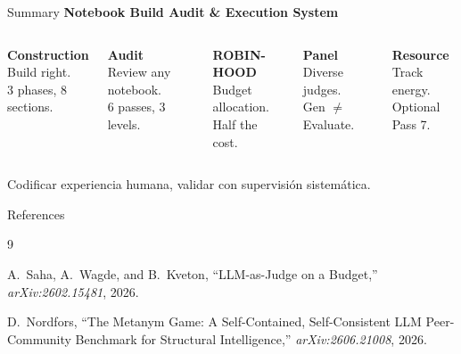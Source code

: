 \documentclass[11pt, aspectratio=169]{beamer}
\begin{document}
\begin{frame}{Summary}
  \centering
  \Large\textbf{Notebook Build Audit \& Execution System}

  \vspace{0.5cm}
  \begin{columns}[T]
      \centering
      \textbf{Construction}\\
      {\small Build right.\\
      3 phases, 8 sections.}

      \centering
      \textbf{Audit}\\
      {\small Review any notebook.\\
      6 passes, 3 levels.}

      \centering
      \textbf{ROBIN-HOOD}\\
      {\small Budget allocation.\\
      Half the cost.}

      \centering
      \textbf{Panel}\\
      {\small Diverse judges.\\
      Gen $\neq$ Evaluate.}

      \centering
      \textbf{Resource}\\
      {\small Track energy.\\
      Optional Pass 7.}
  \end{columns}

  \vspace{0.8cm}
  {\Large\alert{Codificar experiencia humana, validar con supervisión sistemática.}}
\end{frame}

\begin{frame}[allowframebreaks]{References}
  \footnotesize
  \begin{thebibliography}{9}

  A.~Saha, A.~Wagde, and B.~Kveton,
  ``LLM-as-Judge on a Budget,''
  \textit{arXiv:2602.15481}, 2026.

  D.~Nordfors,
  ``The Metanym Game: A Self-Contained, Self-Consistent LLM Peer-Community
  Benchmark for Structural Intelligence,''
  \textit{arXiv:2606.21008}, 2026.

  \end{thebibliography}
\end{frame}
\end{document}
